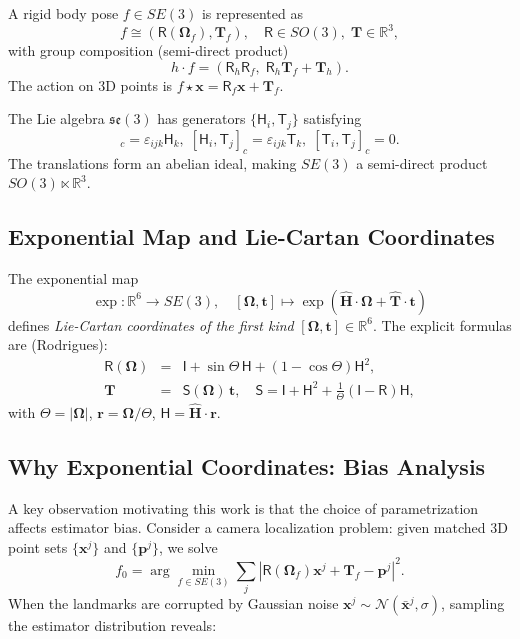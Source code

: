 \documentclass[journal]{IEEEtran}
\newcommand{\real}{\mathbb{R}}
\newcommand{\bfOmega}{\boldsymbol{\Omega}}
\newcommand{\beq}{\begin{equation}}
\newcommand{\eeq}{\end{equation}}
\newcommand{\beqar}{\begin{eqnarray}}
\newcommand{\eeqar}{\end{eqnarray}}
\begin{document}
A rigid body pose $f \in SE(3)$ is represented as
\beq
    f \cong (\mathsf{R}(\bfOmega_f), \mathbf{T}_f),\quad
    \mathsf{R} \in SO(3),\; \mathbf{T} \in \real^3,
    \label{eq:SE3element}
\eeq
with group composition (semi-direct product)
\beq
    h \cdot f = (\mathsf{R}_h \mathsf{R}_f,\; \mathsf{R}_h \mathbf{T}_f + \mathbf{T}_h).
    \label{eq:groupcomp}
\eeq
The action on 3D points is $f \star \mathbf{x} = \mathsf{R}_f \mathbf{x} + \mathbf{T}_f$.

The Lie algebra $\mathfrak{se}(3)$ has generators 
$\{\mathsf{H}_i, \mathsf{T}_j\}$ satisfying
\beq
    [\mathsf{H}_i, \mathsf{H}_j]_c = \varepsilon_{ijk}\mathsf{H}_k,\;
    [\mathsf{H}_i, \mathsf{T}_j]_c = \varepsilon_{ijk}\mathsf{T}_k,\;
    [\mathsf{T}_i, \mathsf{T}_j]_c = 0.
    \label{eq:sealgebra}
\eeq
The translations form an abelian ideal, making $SE(3)$ a 
semi-direct product $SO(3) \ltimes \real^3$.

\subsection{Exponential Map and Lie-Cartan Coordinates}

The exponential map
\beq
    \exp: \real^6 \to SE(3),\quad
    [\bfOmega, \mathbf{t}] \mapsto 
    \exp(\hat{\mathbf{H}} \cdot \bfOmega + \hat{\mathbf{T}} \cdot \mathbf{t})
    \label{eq:expmap}
\eeq
defines \emph{Lie-Cartan coordinates of the first kind} 
$[\bfOmega, \mathbf{t}] \in \real^6$.
The explicit formulas are (Rodrigues):
\beqar
    \mathsf{R}(\bfOmega) &=& \mathsf{I} + \sin\Theta\, \mathsf{H} 
    + (1-\cos\Theta)\mathsf{H}^2, \label{eq:rodrigues} \\
    \mathbf{T} &=& \mathsf{S}(\bfOmega)\, \mathbf{t},\quad
    \mathsf{S} = \mathsf{I} + \mathsf{H}^2 + 
    \frac{1}{\Theta}(\mathsf{I} - \mathsf{R})\mathsf{H}, \nonumber
\eeqar
with $\Theta = |\bfOmega|$, $\mathbf{r} = \bfOmega/\Theta$, 
$\mathsf{H} = \hat{\mathbf{H}} \cdot \mathbf{r}$.

\subsection{Why Exponential Coordinates: Bias Analysis}
\label{subsec:bias}

A key observation motivating this work is that the choice of 
parametrization affects estimator bias. Consider a camera 
localization problem: given matched 3D point sets 
$\{\mathbf{x}^j\}$ and $\{\mathbf{p}^j\}$, we solve
\beq
    f_0 = \arg\min_{f \in SE(3)} \sum_j 
    |\mathsf{R}(\bfOmega_f)\mathbf{x}^j + \mathbf{T}_f - \mathbf{p}^j|^2.
    \label{eq:localization}
\eeq
When the landmarks are corrupted by Gaussian noise 
$\mathbf{x}^j \sim \mathcal{N}(\bar{\mathbf{x}}^j, \sigma)$, 
sampling the estimator distribution reveals:
\end{document}
